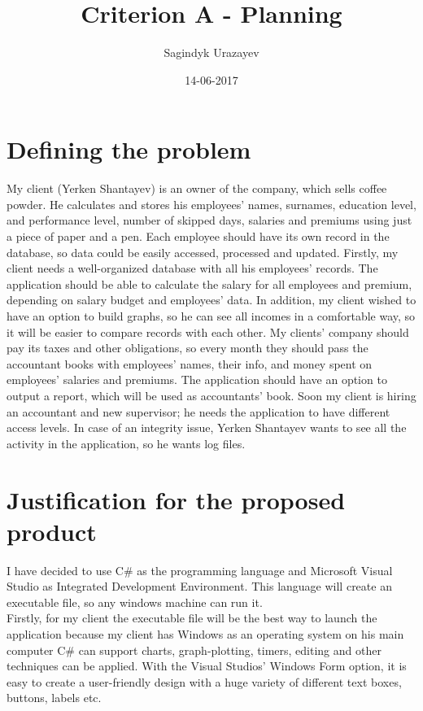 \documentclass[a4]{article}
\title{Criterion A - Planning}
\author{Sagindyk Urazayev}
\date{14-06-2017}
\begin{document}
\doublespacing

\newpage

\section*{Defining the problem}

My client (Yerken Shantayev) is an owner of the company, which sells coffee powder. He calculates and stores his employees’ names, surnames, education level, and performance level, number of skipped days, salaries and premiums using just a piece of paper and a pen. Each employee should have its own record in the database, so data could be easily accessed, processed and updated. Firstly, my client needs a well-organized database with all his employees’ records. The application should be able to calculate the salary for all employees and premium, depending on salary budget and employees’ data. In addition, my client wished to have an option to build graphs, so he can see all incomes in a comfortable way, so it will be easier to compare records with each other. My clients’ company should pay its taxes and other obligations, so every month they should pass the accountant books with employees’ names, their info, and money spent on employees’ salaries and premiums. The application should have an option to output a report, which will be used as accountants’ book. Soon my client is hiring an accountant and new supervisor; he needs the application to have different access levels. In case of an integrity issue, Yerken Shantayev wants to see all the activity in the application, so he wants log files.

\section*{Justification for the proposed product}

I have decided to use C\# as the programming language and Microsoft Visual Studio as Integrated Development Environment. This language will create an executable file, so any windows machine can run it.\\

Firstly, for my client the executable file will be the best way to launch the application because my client has Windows as an operating system on his main computer C\# can support charts, graph-plotting, timers, editing and other techniques can be applied. With the Visual Studios’ Windows Form option, it is easy to create a user-friendly design with a huge variety of different text boxes, buttons, labels etc. \\
\end{document}
